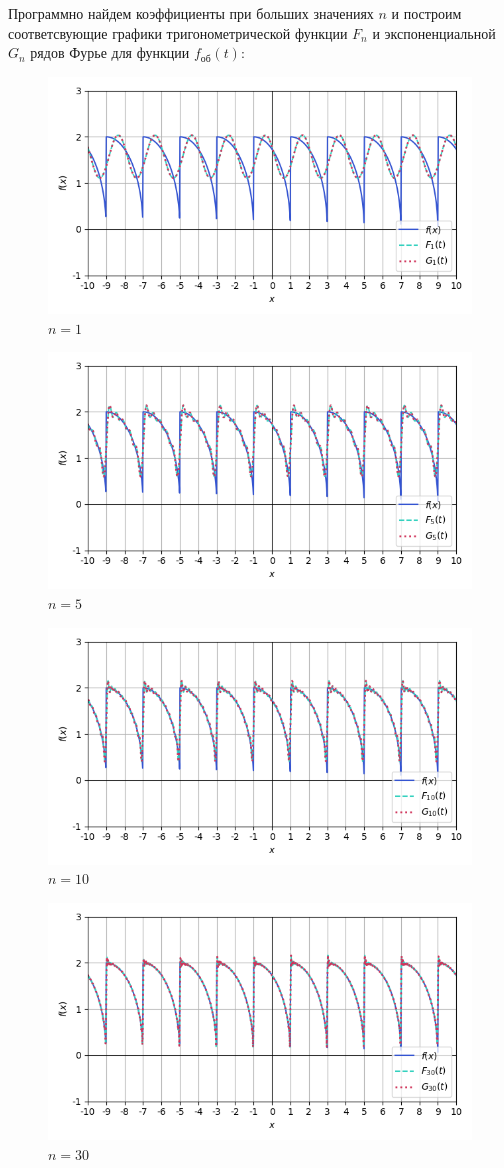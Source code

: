 \documentclass[a4paper]{article}
\begin{document}
Программно найдем коэффициенты при больших значениях $n$ и построим соответсвующие графики тригонометрической функции $F_n$ и экспоненциальной $G_n$ рядов Фурье для функции $f_\text{об}(t)$:
\begin{figure}[H]
    \centering
    \includegraphics[width=0.7\linewidth]{per/Im1.png}
    \caption{$n = 1$}
\end{figure}
\begin{figure}[H]
    \centering
    \includegraphics[width=0.7\linewidth]{per/Im5.png}
    \caption{$n = 5$}
\end{figure}
\begin{figure}[H]
    \centering
    \includegraphics[width=0.7\linewidth]{per/Im10.png}
    \caption{$n = 10$}
\end{figure}
\begin{figure}[H]
    \centering
    \includegraphics[width=0.7\linewidth]{per/Im30.png}
    \caption{$n = 30$}
\end{figure}
\end{document}
